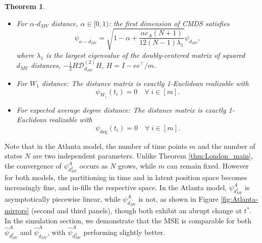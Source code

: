 \documentclass[12pt]{article}
\newtheorem{thm}{Theorem}
\theoremstyle{definition}
\begin{document}
\begin{thm}
\begin{itemize}
\item For $\alpha$-$d_{MV}$ distance, $\alpha\in[0,1)$: the first dimension of CMDS satisfies
$$
\psi_{\alpha -d_{MV}} = \sqrt{1-\alpha + \frac{\alpha c_A(N+1)}{12(N-1)\lambda_1}   }      \psi_{d_{MV}},
$$ 
where $\lambda_1$ is the largest eigenvalue of the doubly-centered matrix of squared $d_{MV}$ distances, $-\frac{1}{2}H \mathcal{D}_{d_{MV}}^{(2)}H$, $H=I-ee^\top/m$.

\item For $W_1$ distance: The distance matrix is exactly 1-Euclidean realizable with
$$
\psi_{W_1}(t_i) = 0 \quad\forall\; i \in [m].
$$

\item For expected average degree distance: The distance matrix is exactly 1-Euclidean realizable with
$$
\psi_{\text{deg}}(t_i) = 0 \quad \forall\;i \in [m].
$$
\end{itemize}
\end{thm}



Note that in the Atlanta model, the number of time points $m$ and the number of states $N$ are two independent parameters.
Unlike Theorem \ref{thm:London_main}, the convergence of $\psi^A_{d^2_{MV}}$ occurs as $N$ grows, while $m$ can remain fixed.
However for both models, the partitioning in time and in latent position space becomes increasingly fine, and in-fills the respective space. In the Atlanta model, $\psi^A_{d^2_{MV}}$ is asymptotically piecewise linear, while $\psi^A_{d_{MV}}$ is not, as shown in Figure \ref{fig:Atlanta-mirrors} (second and third panels), though both exhibit an abrupt change at $t^*$.
In the simulation section, we demonstrate that the MSE is comparable for both $\hat{\psi}^A_{d^2_{MV}}$ and $\hat{\psi}^A_{d_{MV}}$, with $\hat{\psi}^A_{d^2_{MV}}$ performing slightly better.
\end{document}
